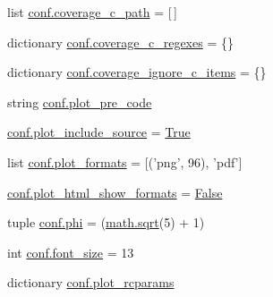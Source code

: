 \begin{DoxyCompactItemize}
\item 
list \hyperlink{namespaceconf_a66c4e69b1e8fef3799e172716eab9f1f}{conf.\+coverage\+\_\+c\+\_\+path} = \mbox{[}$\,$\mbox{]}
\item 
dictionary \hyperlink{namespaceconf_ac5da9552acb99ae9eee8fe6ed27c726b}{conf.\+coverage\+\_\+c\+\_\+regexes} = \{\}
\item 
dictionary \hyperlink{namespaceconf_a36727259bb25073f8a8e6a00f674c583}{conf.\+coverage\+\_\+ignore\+\_\+c\+\_\+items} = \{\}
\item 
string \hyperlink{namespaceconf_a7951284e1e80d61ad717b9345f2b9c6f}{conf.\+plot\+\_\+pre\+\_\+code}
\item 
\hyperlink{namespaceconf_a5e2e05a50752b8f166612fe843188c5d}{conf.\+plot\+\_\+include\+\_\+source} = \hyperlink{libqhull_8h_add3ca9eefe3b5b754426f51d3043e579}{True}
\item 
list \hyperlink{namespaceconf_adbde6e4ba4ea4a0e49f91458929d4ec1}{conf.\+plot\+\_\+formats} = \mbox{[}('png', 96), 'pdf'\mbox{]}
\item 
\hyperlink{namespaceconf_ae9f2c59909a69f8f7f48c341909d3347}{conf.\+plot\+\_\+html\+\_\+show\+\_\+formats} = \hyperlink{libqhull_8h_a306ebd41c0cd1303b1372c6153f0caf8}{False}
\item 
tuple \hyperlink{namespaceconf_a4c4f89ad309f3e6b631369d9564d07e0}{conf.\+phi} = (\hyperlink{vecuops_8cc_ac9f82fdb8cd289615247f897852ee5f2}{math.\+sqrt}(5) + 1)
\item 
int \hyperlink{namespaceconf_a8513964f1baeeec66f3f3df07d05759c}{conf.\+font\+\_\+size} = 13
\item 
dictionary \hyperlink{namespaceconf_af2b068506b37ff5b4bed655c96c5ffa5}{conf.\+plot\+\_\+rcparams}
\end{DoxyCompactItemize}
